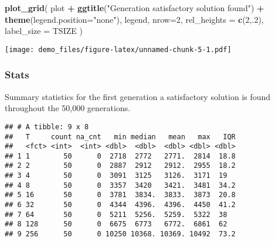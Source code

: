 \documentclass[]{book}
\newenvironment{Shaded}{\begin{snugshade}}{\end{snugshade}}
\newcommand{\DataTypeTok}[1]{\textcolor[rgb]{0.13,0.29,0.53}{#1}}
\newcommand{\DecValTok}[1]{\textcolor[rgb]{0.00,0.00,0.81}{#1}}
\newcommand{\KeywordTok}[1]{\textcolor[rgb]{0.13,0.29,0.53}{\textbf{#1}}}
\newcommand{\NormalTok}[1]{#1}
\newcommand{\OperatorTok}[1]{\textcolor[rgb]{0.81,0.36,0.00}{\textbf{#1}}}
\newcommand{\OtherTok}[1]{\textcolor[rgb]{0.56,0.35,0.01}{#1}}
\newcommand{\StringTok}[1]{\textcolor[rgb]{0.31,0.60,0.02}{#1}}
\begin{document}
\begin{Shaded}
\begin{Highlighting}[]
\KeywordTok{plot_grid}\NormalTok{(}
\NormalTok{  plot }\OperatorTok{+}
\StringTok{    }\KeywordTok{ggtitle}\NormalTok{(}\StringTok{"Generation satisfactory solution found"}\NormalTok{) }\OperatorTok{+}
\StringTok{    }\KeywordTok{theme}\NormalTok{(}\DataTypeTok{legend.position=}\StringTok{"none"}\NormalTok{),}
\NormalTok{  legend,}
  \DataTypeTok{nrow=}\DecValTok{2}\NormalTok{,}
  \DataTypeTok{rel_heights =} \KeywordTok{c}\NormalTok{(}\DecValTok{2}\NormalTok{,.}\DecValTok{2}\NormalTok{),}
  \DataTypeTok{label_size =}\NormalTok{ TSIZE}
\NormalTok{)}
\end{Highlighting}
\end{Shaded}

\texttt{[image: demo\_files/figure-latex/unnamed-chunk-5-1.pdf]}

\hypertarget{stats-17}{%
\subsubsection{Stats}\label{stats-17}}

Summary statistics for the first generation a satisfactory solution is found throughout the 50,000 generations.

\begin{Shaded}
\end{Shaded}

\begin{verbatim}
## # A tibble: 9 x 8
##   T     count na_cnt   min median   mean   max   IQR
##   <fct> <int>  <int> <dbl>  <dbl>  <dbl> <dbl> <dbl>
## 1 1        50      0  2718  2772   2771.  2814  18.8
## 2 2        50      0  2887  2912   2912.  2955  18.2
## 3 4        50      0  3091  3125   3126.  3171  19  
## 4 8        50      0  3357  3420   3421.  3481  34.2
## 5 16       50      0  3781  3834.  3833.  3873  20.8
## 6 32       50      0  4344  4396.  4396.  4450  41.2
## 7 64       50      0  5211  5256.  5259.  5322  38  
## 8 128      50      0  6675  6773   6772.  6861  62  
## 9 256      50      0 10250 10368. 10369. 10492  73.2
\end{verbatim}
\end{document}
